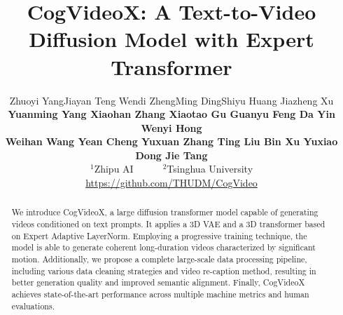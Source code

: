 \documentclass{article} %
\title{CogVideoX: A Text-to-Video Diffusion Model with Expert Transformer}
\author{Zhuoyi Yang\aspace Jiayan Teng \aspace Wendi Zheng\aspace Ming Ding\aspace Shiyu Huang \aspace Jiazheng Xu \aspace \\
\textbf{Yuanming Yang \aspace Xiaohan Zhang \aspace Xiaotao Gu 
\aspace Guanyu Feng \aspace  Da Yin \aspace Wenyi Hong \aspace } \\
\textbf{ Weihan Wang \aspace Yean Cheng \aspace Yuxuan Zhang \aspace Ting Liu \aspace Bin Xu \aspace Yuxiao Dong \aspace Jie Tang} \\
$^1$Zhipu AI\ \ \ \ \ \ $^2$Tsinghua University \\
\href{https://github.com/THUDM/CogVideo}{https://github.com/THUDM/CogVideo}
}
\begin{document}
\maketitle

\renewcommand{\thefootnote}{}
\renewcommand{\thefootnote}{\arabic{footnote}}
\begin{abstract}
We introduce CogVideoX, a large diffusion transformer model capable of generating videos conditioned on text prompts. It applies a 3D VAE and a 3D transformer based on Expert Adaptive LayerNorm. Employing a progressive training technique, the model is able to generate coherent long-duration videos characterized by significant motion. Additionally, we propose a complete large-scale data processing pipeline, including various data cleaning strategies and video re-caption method, resulting in better generation quality and improved semantic alignment. Finally, CogVideoX achieves state-of-the-art performance across multiple machine metrics and human evaluations.
\end{abstract}




















\end{document}
